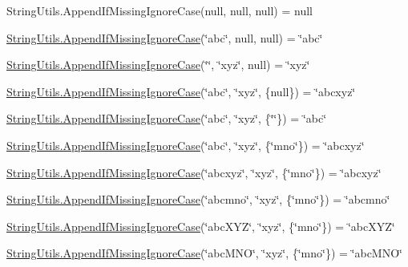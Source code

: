 String\+Utils.\+Append\+If\+Missing\+Ignore\+Case(null, null, null) = null 

\hyperlink{class_ultimate_1_1_utilities_1_1_string_utils_ac348fbb0096f91329675bdada6d76a6b}{String\+Utils.\+Append\+If\+Missing\+Ignore\+Case}(\char`\"{}abc\char`\"{}, null, null) = \char`\"{}abc\char`\"{} 

\hyperlink{class_ultimate_1_1_utilities_1_1_string_utils_ac348fbb0096f91329675bdada6d76a6b}{String\+Utils.\+Append\+If\+Missing\+Ignore\+Case}(\char`\"{}\char`\"{}, \char`\"{}xyz\char`\"{}, null) = \char`\"{}xyz\char`\"{} 

\hyperlink{class_ultimate_1_1_utilities_1_1_string_utils_ac348fbb0096f91329675bdada6d76a6b}{String\+Utils.\+Append\+If\+Missing\+Ignore\+Case}(\char`\"{}abc\char`\"{}, \char`\"{}xyz\char`\"{}, \{null\}) = \char`\"{}abcxyz\char`\"{} 

\hyperlink{class_ultimate_1_1_utilities_1_1_string_utils_ac348fbb0096f91329675bdada6d76a6b}{String\+Utils.\+Append\+If\+Missing\+Ignore\+Case}(\char`\"{}abc\char`\"{}, \char`\"{}xyz\char`\"{}, \{\char`\"{}\char`\"{}\}) = \char`\"{}abc\char`\"{} 

\hyperlink{class_ultimate_1_1_utilities_1_1_string_utils_ac348fbb0096f91329675bdada6d76a6b}{String\+Utils.\+Append\+If\+Missing\+Ignore\+Case}(\char`\"{}abc\char`\"{}, \char`\"{}xyz\char`\"{}, \{\char`\"{}mno\char`\"{}\}) = \char`\"{}abcxyz\char`\"{} 

\hyperlink{class_ultimate_1_1_utilities_1_1_string_utils_ac348fbb0096f91329675bdada6d76a6b}{String\+Utils.\+Append\+If\+Missing\+Ignore\+Case}(\char`\"{}abcxyz\char`\"{}, \char`\"{}xyz\char`\"{}, \{\char`\"{}mno\char`\"{}\}) = \char`\"{}abcxyz\char`\"{} 

\hyperlink{class_ultimate_1_1_utilities_1_1_string_utils_ac348fbb0096f91329675bdada6d76a6b}{String\+Utils.\+Append\+If\+Missing\+Ignore\+Case}(\char`\"{}abcmno\char`\"{}, \char`\"{}xyz\char`\"{}, \{\char`\"{}mno\char`\"{}\}) = \char`\"{}abcmno\char`\"{} 

\hyperlink{class_ultimate_1_1_utilities_1_1_string_utils_ac348fbb0096f91329675bdada6d76a6b}{String\+Utils.\+Append\+If\+Missing\+Ignore\+Case}(\char`\"{}abc\+X\+Y\+Z\char`\"{}, \char`\"{}xyz\char`\"{}, \{\char`\"{}mno\char`\"{}\}) = \char`\"{}abc\+X\+Y\+Z\char`\"{} 

\hyperlink{class_ultimate_1_1_utilities_1_1_string_utils_ac348fbb0096f91329675bdada6d76a6b}{String\+Utils.\+Append\+If\+Missing\+Ignore\+Case}(\char`\"{}abc\+M\+N\+O\char`\"{}, \char`\"{}xyz\char`\"{}, \{\char`\"{}mno\char`\"{}\}) = \char`\"{}abc\+M\+N\+O\char`\"{} 


